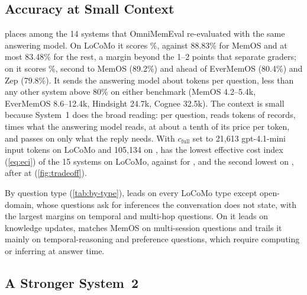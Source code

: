 \subsection{Accuracy at Small Context}
\label{sec:main}

 places \sys{} among the 14 systems that OmniMemEval re-evaluated with the same answering model.
On LoCoMo it scores \finLoCoMo\%, against 88.83\% for MemOS and at most 83.48\% for the rest, a margin beyond the 1--2 points that separate graders; on \lme{} it scores \finLME\%, second to MemOS (89.2\%) and ahead of EverMemOS (80.4\%) and Zep (79.8\%).
It sends the answering model about \finCtxLoCoMo{} tokens per question, less than any other system above 80\% on either benchmark (MemOS 4.2--5.4k, EverMemOS 8.6--12.4k, Hindsight 24.7k, Cognee 32.5k).
The context is small because System~1 does the broad reading: per question, \jev{} reads \jevTokRange{} tokens of records, \jevRatioRange{} times what the answering model reads, at about a tenth of its price per token, and passes on only what the reply needs.
With $c_\text{full}$ set to 21,613 gpt-4.1-mini input tokens on LoCoMo and 105,134 on \lme, \sys{} has the lowest effective cost index (\cref{eq:eci}) of the 15 systems on LoCoMo, \finEciLoCoMo{} against \eciOtherLoCoMo{} for \eciOtherNameLoCoMo, and the second lowest on \lme, \finEciLME{} after \eciOtherNameLME{} at \eciOtherLME{} (\cref{fig:tradeoff}).



By question type (\cref{tab:by-type}), \sys{} leads on every LoCoMo type except open-domain, whose questions ask for inferences the conversation does not state, with the largest margins on temporal and multi-hop questions.
On \lme{} it leads on knowledge updates, matches MemOS on multi-session questions and trails it mainly on temporal-reasoning and preference questions, which require computing or inferring at answer time.



\subsection{A Stronger System~2}
\label{sec:reasoning}

